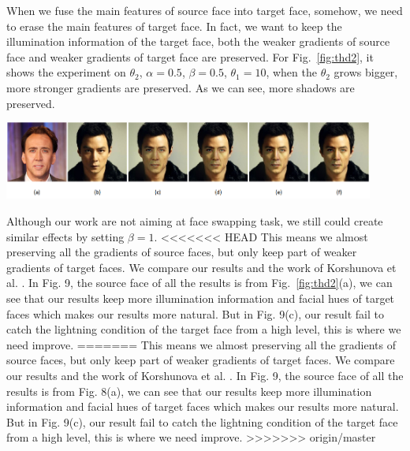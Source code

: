 When we fuse the main features of source face into target face, somehow, we need to erase the main features of target face. In fact, we want to keep the illumination information of the target face, both the weaker gradients of source face and weaker gradients of target face are preserved. For Fig.~\ref{fig:thd2}, it shows the experiment on $\theta_2$,  $\alpha = 0.5$, $\beta = 0.5$, $\theta_1 = 10$, when the $\theta_2$ grows bigger, more stronger gradients are preserved. As we can see, more shadows are preserved.

\begin{center}
    \includegraphics[width=4.8in]{images/thd2.png}
    \label{fig:thd2}
\end{center}

Although our work are not aiming at face swapping task, we still could create similar effects by setting $\beta = 1$.
<<<<<<< HEAD
%
This means we almost preserving all the gradients of source faces, but only keep part of weaker gradients of target faces. We compare our results and the work of Korshunova et al. \cite{faceswapping}. In Fig. 9, the source face of all the results is from Fig.~\ref{fig:thd2}(a), we can see that our results keep more illumination information and facial hues of target faces which makes our results more natural. But in Fig. 9(c), our result fail to catch the lightning condition of the target face from a high level, this is where we need improve.
=======
% 
This means we almost preserving all the gradients of source faces, but only keep part of weaker gradients of target faces. We compare our results and the work of Korshunova et al. \cite{faceswapping}. In Fig. 9, the source face of all the results is from Fig. 8(a), we can see that our results keep more illumination information and facial hues of target faces which makes our results more natural. But in Fig. 9(c), our result fail to catch the lightning condition of the target face from a high level, this is where we need improve.
>>>>>>> origin/master

